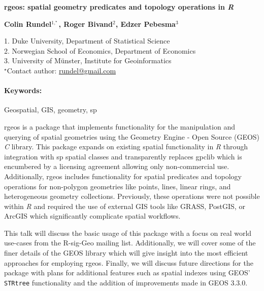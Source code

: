 \documentclass[11pt, a4paper]{article}
\newcommand{\pkg}[1]{{\normalfont\fontseries{b}\selectfont #1}}
\let\proglang=\textit
\let\code=\texttt
\renewcommand{\title}[1]{\begin{center}{\bf \LARGE #1}\end{center}}
\newcommand{\keywords}{\paragraph{Keywords:}}
\begin{document}
\pagestyle{empty}

\title{\pkg{rgeos}: spatial geometry predicates and topology operations in \proglang{R}}


\begin{center}
  {\bf Colin Rundel$^{1,^\star}$, Roger Bivand$^{2}$, Edzer Pebesma$^{3}$}
\end{center}

\begin{affiliations}
1. Duke University, Department of Statistical Science \\[-2pt]
2. Norwegian School of Economics, Department of Economics \\[-2pt]
3. University of M\"unster, Institute for Geoinformatics \\[-2pt]
$^\star$Contact author: \href{mailto:rundel@gmail.com}{rundel@gmail.com}\\
\end{affiliations}

\keywords Geospatial, GIS, geometry, sp 

\vskip 0.8cm

\pkg{rgeos} is a package that implements functionality for the manipulation and querying of spatial geometries using the Geometry Engine - Open Source (GEOS) \proglang{C} library. This package expands on existing spatial functionality in \proglang{R} through integration with \pkg{sp} spatial classes and transparently replaces \pkg{gpclib} which is encumbered by a licensing agreement allowing only non-commercial use. Additionally, \pkg{rgeos} includes functionality for spatial predicates and topology operations for non-polygon geometries like points, lines, linear rings, and heterogeneous geometry collections. Previously, these operations were not possible within \proglang{R} and required the use of external GIS tools like GRASS, PostGIS, or ArcGIS which significantly complicate spatial workflows.

This talk will discuss the basic usage of this package with a focus on real world use-cases from the R-sig-Geo mailing list. Additionally, we will cover some of the finer details of the GEOS library which will give insight into the most efficient approaches for employing \pkg{rgeos}. Finally, we will discuss future directions for the package with plans for additional features such as spatial indexes using GEOS' \code{STRtree} functionality and the addition of improvements made in GEOS 3.3.0.
\end{document}
